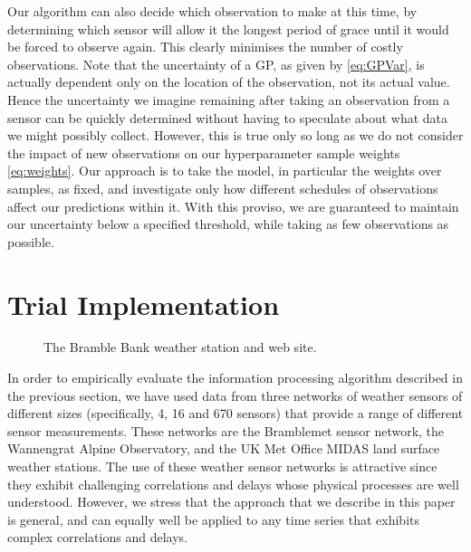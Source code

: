 \documentclass{acmtrans2m}
\begin{document}
Our algorithm can also decide which observation to make at this time, by determining which sensor will allow it the longest period of grace until it would be forced to observe again. This clearly minimises the number of costly observations. Note that the uncertainty of a GP, as given by \eqref{eq:GPVar}, is actually dependent only on the location of the observation, not its actual value. Hence the uncertainty we imagine remaining after taking an observation from a sensor can be quickly determined without having to speculate about what data we might possibly collect. However, this is true only so long as we do not consider the impact of new observations on our hyperparameter sample weights \eqref{eq:weights}. Our approach is to take the model, in particular the weights over samples, as fixed, and investigate only how different schedules of observations affect our predictions within it. With this proviso, we are guaranteed to maintain our uncertainty below a specified threshold, while taking as few observations as possible.

\section{Trial Implementation}\label{sec_implementation}

\begin{figure}
\begin{center}
 \hspace{0.25cm}
\caption{The Bramble Bank weather station and web site.}
\label{bramble_sensor}
\end{center}
\end{figure}

\noindent In order to empirically evaluate the information processing algorithm described in the previous section, we have used data from three networks of weather sensors of different sizes (specifically, 4, 16 and 670 sensors) that provide a range of different sensor measurements. These networks are the Bramblemet sensor network, the Wannengrat Alpine Observatory, and the UK Met Office MIDAS land surface weather stations. The use of these weather sensor networks is attractive since they exhibit challenging correlations and delays whose physical processes are well understood. However, we stress that the approach that we describe in this paper is general, and can equally well be applied to any time series that exhibits complex correlations and delays.
\end{document}

